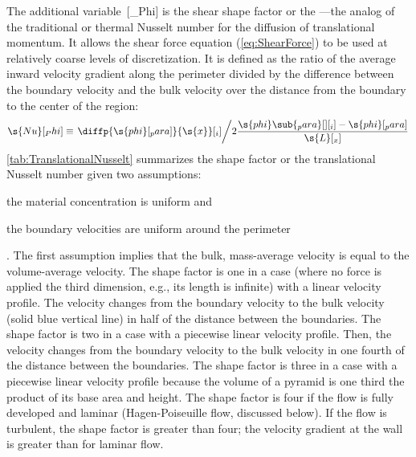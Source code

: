 The additional variable~[_Phi] is the shear shape factor or the \emph{}---the analog of the traditional or thermal Nusselt number for the diffusion of translational momentum.  It allows the shear force equation (\ref{eq:ShearForce}) to be used at relatively coarse levels of discretization.  It is defined as the ratio of the average inward velocity gradient along the perimeter divided by the difference between the boundary velocity and the bulk velocity over the distance from the boundary to the center of the region:
\begin{equation}
  \label{eq:TranslationalNusselt}
  \s{Nu}[_Phi] \equiv \left.\diffp{\s{phi}[_para]}{\s{x}}[_i]\middle/2\frac{\s{phi}\sub{_para}[ ][_i] - \s{phi}[_para]}{\s{L}[_x]}\right.
\end{equation}
\autoref{tab:TranslationalNusselt} summarizes the shape factor or the translational Nusselt number given two assumptions: \begin{inparaenum}[(1)]\item the material concentration is uniform and \item the boundary velocities are uniform around the perimeter\end{inparaenum}.  The first assumption implies that the bulk, mass-average velocity is equal to the volume-average velocity.  The shape factor is one in a  case (where no force is applied the third dimension, e.g., its length is infinite) with a linear velocity profile.  The velocity changes from the boundary velocity to the bulk velocity (solid blue vertical line) in half of the distance between the boundaries.  The shape factor is two in a  case with a piecewise linear velocity profile.  Then, the velocity changes from the boundary velocity to the bulk velocity in one fourth of the distance between the boundaries.  The shape factor is three in a  case with a piecewise linear velocity profile because the volume of a pyramid is one third the product of its base area and height.  The shape factor is four if the flow is fully developed and laminar (Hagen-Poiseuille flow, discussed below).  If the flow is turbulent, the shape factor is greater than four; the velocity gradient at the wall is greater than for laminar flow.

